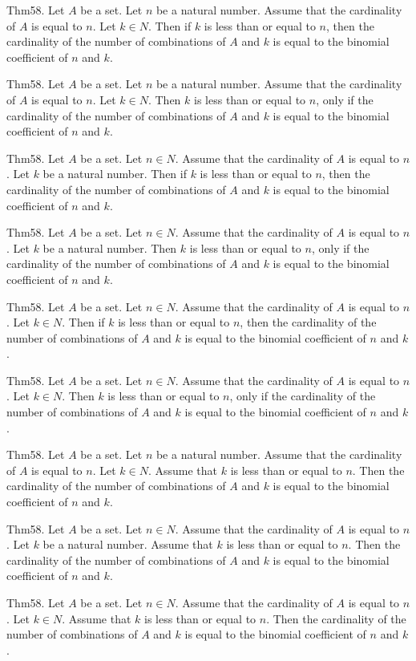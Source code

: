 \documentclass{article}
\begin{document}
Thm58. Let $A$ be a set. Let $n$ be a natural number. Assume that the cardinality of $A$ is equal to $n$. Let $k \in N$. Then if $k$ is less than or equal to $n$, then the cardinality of the number of combinations of $A$ and $k$ is equal to the binomial coefficient of $n$ and $k$.

Thm58. Let $A$ be a set. Let $n$ be a natural number. Assume that the cardinality of $A$ is equal to $n$. Let $k \in N$. Then $k$ is less than or equal to $n$, only if the cardinality of the number of combinations of $A$ and $k$ is equal to the binomial coefficient of $n$ and $k$.

Thm58. Let $A$ be a set. Let $n \in N$. Assume that the cardinality of $A$ is equal to $n$. Let $k$ be a natural number. Then if $k$ is less than or equal to $n$, then the cardinality of the number of combinations of $A$ and $k$ is equal to the binomial coefficient of $n$ and $k$.

Thm58. Let $A$ be a set. Let $n \in N$. Assume that the cardinality of $A$ is equal to $n$. Let $k$ be a natural number. Then $k$ is less than or equal to $n$, only if the cardinality of the number of combinations of $A$ and $k$ is equal to the binomial coefficient of $n$ and $k$.

Thm58. Let $A$ be a set. Let $n \in N$. Assume that the cardinality of $A$ is equal to $n$. Let $k \in N$. Then if $k$ is less than or equal to $n$, then the cardinality of the number of combinations of $A$ and $k$ is equal to the binomial coefficient of $n$ and $k$.

Thm58. Let $A$ be a set. Let $n \in N$. Assume that the cardinality of $A$ is equal to $n$. Let $k \in N$. Then $k$ is less than or equal to $n$, only if the cardinality of the number of combinations of $A$ and $k$ is equal to the binomial coefficient of $n$ and $k$.

Thm58. Let $A$ be a set. Let $n$ be a natural number. Assume that the cardinality of $A$ is equal to $n$. Let $k \in N$. Assume that $k$ is less than or equal to $n$. Then the cardinality of the number of combinations of $A$ and $k$ is equal to the binomial coefficient of $n$ and $k$.

Thm58. Let $A$ be a set. Let $n \in N$. Assume that the cardinality of $A$ is equal to $n$. Let $k$ be a natural number. Assume that $k$ is less than or equal to $n$. Then the cardinality of the number of combinations of $A$ and $k$ is equal to the binomial coefficient of $n$ and $k$.

Thm58. Let $A$ be a set. Let $n \in N$. Assume that the cardinality of $A$ is equal to $n$. Let $k \in N$. Assume that $k$ is less than or equal to $n$. Then the cardinality of the number of combinations of $A$ and $k$ is equal to the binomial coefficient of $n$ and $k$.
\end{document}
